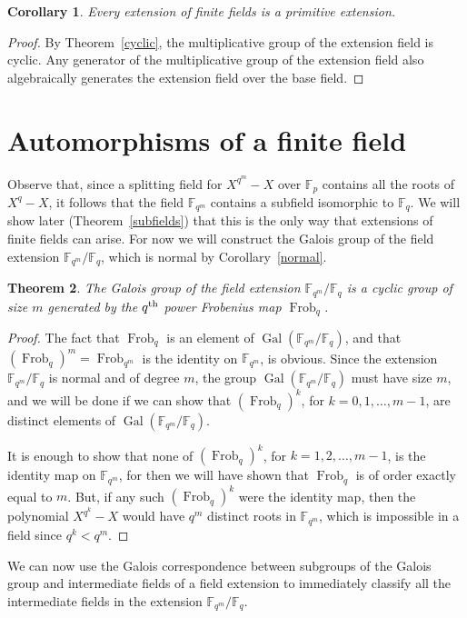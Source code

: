 \documentclass[12pt]{article}
\newcommand{\F}{\mathbb{F}}
\newcommand{\Frob}{\operatorname{Frob}}
\newcommand{\Gal}{\operatorname{Gal}}
\newtheorem{theorem}{Theorem}[section]
\newtheorem{corollary}[theorem]{Corollary}
\theoremstyle{definition}
\begin{document}
\begin{corollary}
Every extension of finite fields is a primitive extension.
\end{corollary}
\begin{proof}
By Theorem~\ref{cyclic}, the multiplicative group of the extension field is cyclic. Any generator of the multiplicative group of the extension field also algebraically generates the extension field over the base field.
\end{proof}

\section{Automorphisms of a finite field}

Observe that, since a splitting field for $X^{q^m} - X$ over $\F_p$
contains all the roots of $X^q - X$, it follows that the field
$\F_{q^m}$ contains a subfield isomorphic to $\F_q$. We will show
later (Theorem~\ref{subfields}) that this is the only way that extensions of
finite fields can arise. For now we will construct the Galois group of
the field extension $\F_{q^m}/\F_q$, which is normal by
Corollary~\ref{normal}.

\begin{theorem}
The Galois group of the field extension $\F_{q^m}/\F_q$ is a cyclic
group of size $m$ generated by the $q^{\rm th}$ power Frobenius map
$\Frob_q$.
\end{theorem}
\begin{proof}
The fact that $\Frob_q$ is an element of $\Gal(\F_{q^m}/\F_q)$, and
that $(\Frob_q)^m = \Frob_{q^m}$ is the identity on $\F_{q^m}$, is
obvious. Since the extension $\F_{q^m}/\F_q$ is normal and of degree
$m$, the group $\Gal(\F_{q^m}/\F_q)$ must have size $m$, and we will
be done if we can show that $(\Frob_q)^k$, for $k = 0, 1, \ldots,
m-1$, are distinct elements of $\Gal(\F_{q^m}/\F_q)$.

It is enough to show that none of $(\Frob_q)^k$, for $k = 1, 2,
\ldots, m-1$, is the identity map on $\F_{q^m}$, for then we will have
shown that $\Frob_q$ is of order exactly equal to $m$. But, if any
such $(\Frob_q)^k$ were the identity map, then the polynomial $X^{q^k}
- X$ would have $q^m$ distinct roots in $\F_{q^m}$, which is
impossible in a field since $q^k < q^m$.
\end{proof}

We can now use the Galois correspondence between subgroups of the
Galois group and intermediate fields of a field extension to
immediately classify all the intermediate fields in the extension
$\F_{q^m}/\F_q$.
\end{document}

